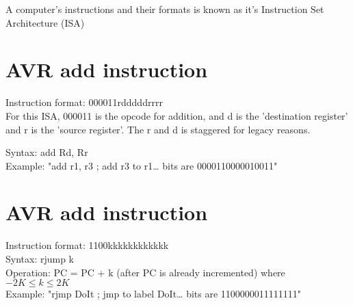 \documentclass{article}
\begin{document}
A computer's instructions and their formats is known as it's Instruction Set Architecture (ISA)

\section{AVR add instruction}
Instruction format: 000011rdddddrrrr\\
For this ISA, 000011 is the opcode for addition, and d is the 'destination register' and r is the 'source register'. The r and d is staggered for legacy reasons.

Syntax: add Rd, Rr\\
Example: "add r1, r3 ; add r3 to r1… bits are 0000110000010011"\\

\section{AVR add instruction}
Instruction format: 1100kkkkkkkkkkkk\\

Syntax: rjump k\\
Operation: PC = PC + k (after PC is already incremented) where $-2K \leq k \leq 2K$\\
Example: "rjmp DoIt ; jmp to label DoIt… bits are 1100000011111111"\\
\end{document}
